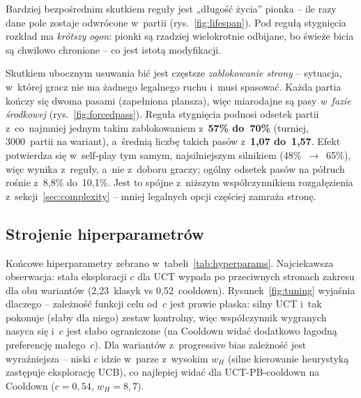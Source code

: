 \documentclass[12pt,a4paper]{article}
\begin{document}
Bardziej bezpośrednim skutkiem reguły jest „długość życia” pionka -- ile razy dane pole zostaje
odwrócone w~partii (rys.~\ref{fig:lifespan}). Pod regułą stygnięcia rozkład ma \emph{krótszy ogon}:
pionki są rzadziej wielokrotnie odbijane, bo świeże bicia są chwilowo chronione -- co jest istotą
modyfikacji.



Skutkiem ubocznym usuwania bić jest częstsze \emph{zablokowanie strony} -- sytuacja, w~której gracz
nie ma żadnego legalnego ruchu i~musi spasować. Każda partia kończy się dwoma pasami (zapełniona
plansza), więc miarodajne są pasy \emph{w~fazie środkowej} (rys.~\ref{fig:forcedpass}). Reguła
stygnięcia podnosi odsetek partii z~co~najmniej jednym takim zablokowaniem z~\textbf{57\% do~70\%}
(turniej, 3000~partii na wariant), a~średnią liczbę takich pasów z~\textbf{1,07 do~1,57}. Efekt
potwierdza się w~self-play tym samym, najsilniejszym silnikiem (\mbox{48\%~$\to$~65\%}), więc wynika
z~reguły, a~nie z~doboru graczy; ogólny odsetek pasów na półruch rośnie z~8,8\% do~10,1\%. Jest to
spójne z~niższym współczynnikiem rozgałęzienia z~sekcji~\ref{sec:complexity} -- mniej legalnych opcji
częściej zamraża stronę.



\subsection{Strojenie hiperparametrów}\label{sec:tuning-results}
Końcowe hiperparametry zebrano w~tabeli~\ref{tab:hyperparams}. Najciekawsza obserwacja: stała
eksploracji $c$ dla UCT wypada po przeciwnych stronach zakresu dla obu wariantów (2,23~klasyk vs
0,52~cooldown). Rysunek~\ref{fig:tuning} wyjaśnia dlaczego -- zależność funkcji celu od~$c$ jest
prawie płaska: silny UCT i~tak pokonuje (słaby dla niego) zestaw kontrolny, więc współczynnik
wygranych nasyca się i~$c$ jest słabo ograniczone (na Cooldown widać dodatkowo łagodną preferencję
małego~$c$). Dla wariantów z~progressive bias zależność jest wyraźniejsza -- niski $c$ idzie
w~parze z~wysokim $w_H$ (silne kierowanie heurystyką zastępuje eksplorację UCB), co najlepiej widać
dla UCT-PB-cooldown na Cooldown ($c{=}0{,}54$, $w_H{=}8{,}7$).




\end{document}
